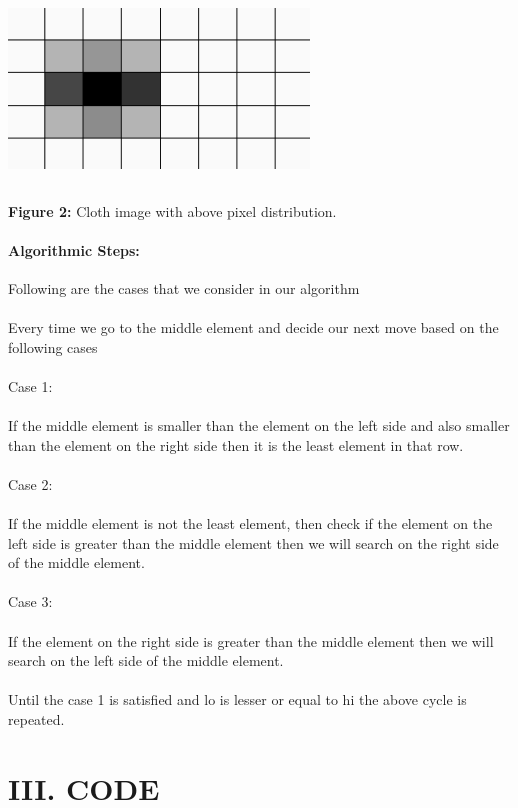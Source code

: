 \documentclass[10pt]{article}
\begin{document}
\begin{multicols*}{2}
\includegraphics[width=8cm, height=5cm]{clothimage.png}\begin{center}\textbf{Figure 2:} Cloth image with above pixel distribution.\end{center}


\paragraph{Algorithmic Steps:}

Following are the cases that we consider in our algorithm\\\\Every time we go to the middle element and decide our next move based on the following cases\\\\Case 1:\\\\If the middle element is smaller than the element on the left side and also smaller than the element on the right side then it is the least element in that row.\\\\Case 2:\\\\If the middle element is not the least element, then check if the element on the left side is greater than the middle element then we will search on the right side of the middle element.\\\\Case 3:\\\\If the element on the right side is greater than the middle element then we will search on the left side of the middle element.\\\\Until the case 1 is satisfied and lo is lesser or equal to hi the above cycle is repeated.


\section*{III. CODE}


\end{multicols*}
\end{document}
